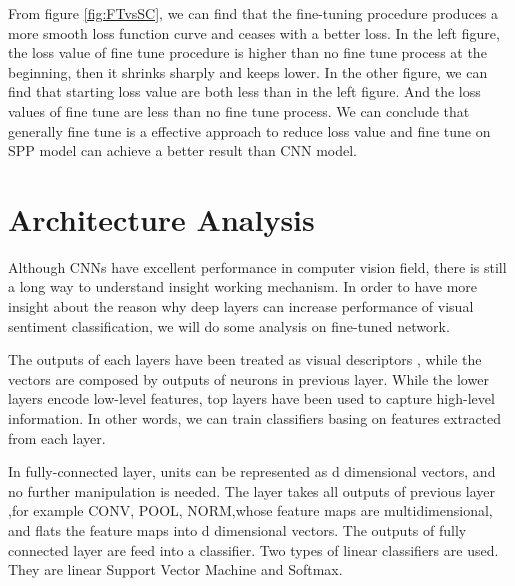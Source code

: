 From figure \ref{fig:FTvsSC}, we can find that the fine-tuning procedure produces a more smooth loss function curve and ceases with a better loss. In the left figure, the loss value of fine tune procedure is higher than no fine tune process at the beginning, then it shrinks sharply and keeps lower. In the other figure, we can find that starting loss value are both less than in the left figure. And the loss values of fine tune are less than no fine tune process. We can conclude that generally fine tune is a effective approach to reduce loss value and fine tune on SPP model can achieve a better result than CNN model.

\section{Architecture Analysis}

Although CNNs have excellent performance in computer vision field, there is still a long way to understand insight working mechanism. In order to have more insight about the reason why deep layers can increase performance of visual sentiment classification, we will do some analysis on fine-tuned network.

The outputs of each layers have been treated as visual descriptors \citep{razavian2014cnn}, while the vectors are composed by outputs of neurons in previous layer. While the lower layers encode low-level features, top layers have been used to capture high-level information. In other words, we can train classifiers basing on features extracted from each layer.

In fully-connected layer, units can be represented as d dimensional vectors, and no further manipulation is needed. The layer takes all outputs of previous layer ,for example CONV, POOL, NORM,whose feature maps are multidimensional, and flats the feature maps into d dimensional vectors. The outputs of fully connected layer are feed into a classifier. Two types of linear classifiers are used. They are linear Support Vector Machine and Softmax.


